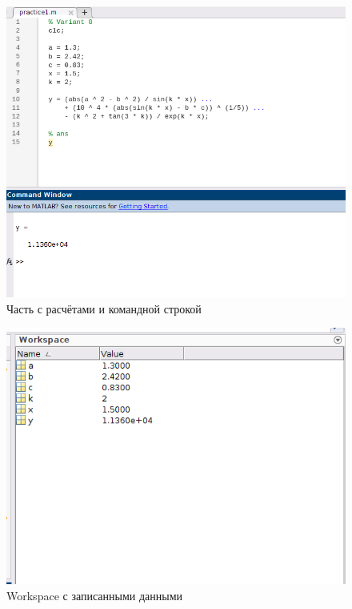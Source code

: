 \documentclass[12pt]{article}
\begin{document}
\begin{figure}[!h]
	\centering
	\includegraphics[width=0.75\linewidth]{calculation.png}
	\caption{Часть с расчётами и командной строкой}
\end{figure}

\begin{figure}[!h]
	\centering
	\includegraphics[width=0.5\linewidth]{workspace.png}
	\caption{Workspace с записанными данными}
\end{figure}
 
\end{document}
